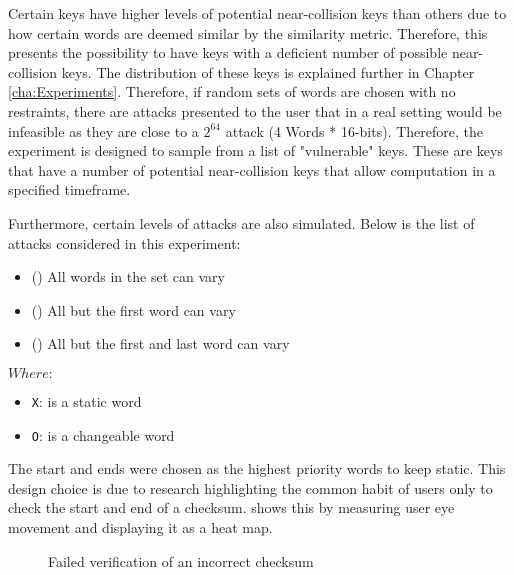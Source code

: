 Certain keys have higher levels of potential near-collision keys than others due to how certain words are deemed similar by the similarity metric. Therefore, this presents the possibility to have keys with a deficient number of possible near-collision keys. The distribution of these keys is explained further in Chapter \ref{cha:Experiments}. Therefore, if random sets of words are chosen with no restraints, there are attacks presented to the user that in a real setting would be infeasible as they are close to a $2^{64}$ attack (4 Words * 16-bits). Therefore, the experiment is designed to sample from a list of "vulnerable" keys. These are keys that have a number of potential near-collision keys that allow computation in a specified timeframe. 

Furthermore, certain levels of attacks are also simulated. Below is the list of attacks considered in this experiment: 

\begin{itemize}
    \item (\OOOO) All words in the set can vary             
    \item (\XOOO) All but the first word can vary           
    \item (\XOOX) All but the first and last word can vary  
\end{itemize}

$Where: $
\begin{itemize}
    \item[] \verb|X|: is a static word
    \item[] \verb|O|: is a changeable word
\end{itemize}

The start and ends were chosen as the highest priority words to keep static. This design choice is due to research highlighting the common habit of users only to check the start and end of a checksum. \cite{cherubini2018towards} shows this by measuring user eye movement and displaying it as a heat map.

\begin{figure}[h!]
    \centering
    \caption{Failed verification of an incorrect checksum\cite{cherubini2018towards}}
    \label{fig:heatMap}
\end{figure}

